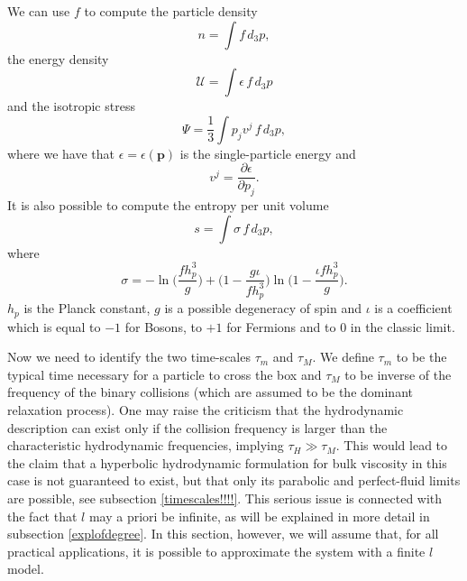 \documentclass[useAMS,usenatbib,prd,twocolumn,nofootinbib]{revtex4-1}
\newcommand{\vect}[1]{\mathbf{{#1}}}
\begin{document}
We can use $f$ to compute the particle density
\begin{equation}\label{densità}
n = \int f \, d_3 p ,
\end{equation}
the energy density
\begin{equation}\label{energgia}
\mathcal{U} = \int \epsilon \, f \, d_3 p 
\end{equation}
and the isotropic stress
\begin{equation}\label{pressszione}
\Psi =\dfrac{1}{3} \int  p_j v^j \, f \, d_3 p ,
\end{equation}
where we have that $\epsilon = \epsilon (\vect{p})$ is the single-particle energy and
\begin{equation}\label{VvvV}
v^j = \dfrac{\partial \epsilon}{\partial p_j}.
\end{equation}
It is also possible to compute the entropy per unit volume
\begin{equation}\label{SssS}
s = \int \sigma \, f \, d_3 p,
\end{equation}
where
\begin{equation}\label{sigma}
\sigma = -\ln \bigg( \dfrac{f h_p^3}{g} \bigg) + \bigg( 1- \dfrac{g\iota}{ f h_p^3} \bigg) \ln \bigg( 1- \dfrac{\iota fh_p^3}{g} \bigg).
\end{equation}
$h_p$ is the Planck constant, $g$ is a possible degeneracy of spin and $\iota$ is a coefficient which is equal to $-1$ for Bosons, to $+1$ for Fermions and to $0$ in the classic limit. 

Now we need to identify the two time-scales $\tau_m$ and $\tau_M$. We define $\tau_m$ to be the typical time necessary for a particle to cross the box and $\tau_M$ to be inverse of the frequency of the binary collisions (which are assumed to be the dominant relaxation process). One may raise the criticism that the hydrodynamic description can exist only if the collision frequency is larger than the characteristic hydrodynamic frequencies, implying $\tau_H \gg \tau_M$. This would lead to the claim that a hyperbolic hydrodynamic formulation for bulk viscosity in this case is not guaranteed to exist, but that only its parabolic and perfect-fluid limits are possible, see subsection \ref{timescales!!!!}. This serious issue is connected with the fact that $l$ may a priori be infinite, as will be explained in more detail in subsection \ref{explofdegree}. In this section, however, we will assume that, for all practical applications, it is possible to approximate the system with a finite $l$ model. 
\end{document}
